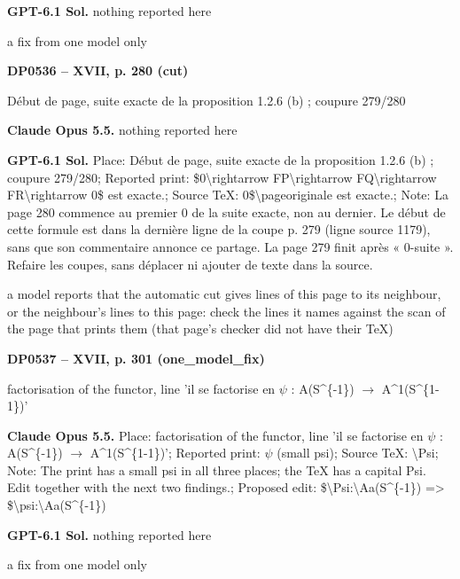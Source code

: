 \textbf{GPT-6.1 Sol.} nothing reported here\par
a fix from one model only\par
\par\noindent\hypertarget{DP0536}{}\textbf{DP0536 -- XVII, p. 280 (cut)}\par
Début de page, suite exacte de la proposition 1.2.6 (b) ; coupure 279/280\par
\textbf{Claude Opus 5.5.} nothing reported here\par
\textbf{GPT-6.1 Sol.} Place: Début de page, suite exacte de la proposition 1.2.6 (b) ; coupure 279/280; Reported print: \$0\textbackslash{}rightarrow FP\textbackslash{}rightarrow FQ\textbackslash{}rightarrow FR\textbackslash{}rightarrow 0\$ est exacte.; Source TeX: 0\$\textbackslash{}pageoriginale est exacte.; Note: La page 280 commence au premier 0 de la suite exacte, non au dernier. Le début de cette formule est dans la dernière ligne de la coupe p. 279 (ligne source 1179), sans que son commentaire annonce ce partage. La page 279 finit après « 0-suite ». Refaire les coupes, sans déplacer ni ajouter de texte dans la source.\par
a model reports that the automatic cut gives lines of this page to its neighbour, or the neighbour's lines to this page: check the lines it names against the scan of the page that prints them (that page's checker did not have their TeX)\par
\par\noindent\hypertarget{DP0537}{}\textbf{DP0537 -- XVII, p. 301 (one\_model\_fix)}\par
factorisation of the functor, line 'il se factorise en \ensuremath{\psi} : A(S\textasciicircum{}\{-1\}) \ensuremath{\to} A\textasciicircum{}1(S\textasciicircum{}\{1-1\})'\par
\textbf{Claude Opus 5.5.} Place: factorisation of the functor, line 'il se factorise en \ensuremath{\psi} : A(S\textasciicircum{}\{-1\}) \ensuremath{\to} A\textasciicircum{}1(S\textasciicircum{}\{1-1\})'; Reported print: \ensuremath{\psi} (small psi); Source TeX: \textbackslash{}Psi; Note: The print has a small psi in all three places; the TeX has a capital Psi. Edit together with the next two findings.; Proposed edit: \$\textbackslash{}Psi:\textbackslash{}Aa(S\textasciicircum{}\{-1\}) =\allowbreak > \$\textbackslash{}psi:\textbackslash{}Aa(S\textasciicircum{}\{-1\})\par
\textbf{GPT-6.1 Sol.} nothing reported here\par
a fix from one model only\par

